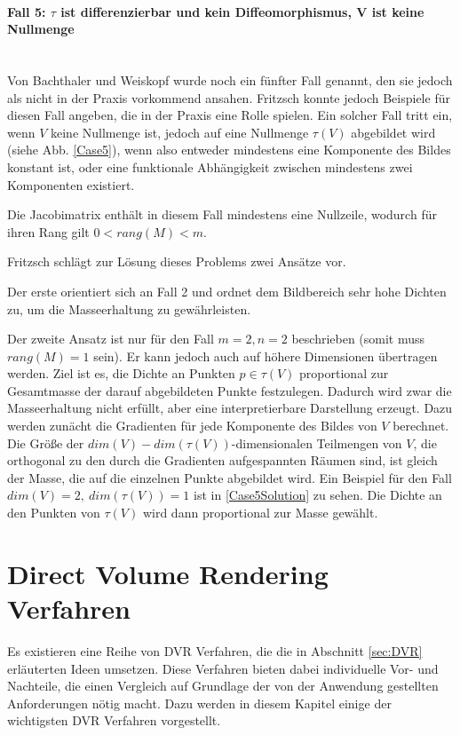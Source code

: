 \documentclass[a4paper,fontsize=12pt,toc=bib,halfparskip]{scrartcl}
\begin{document}
\paragraph{Fall 5: $\tau$ ist differenzierbar und kein Diffeomorphismus, V ist keine Nullmenge}\mbox{}\\
Von Bachthaler und Weiskopf wurde noch ein f\"unfter Fall genannt, den sie jedoch als nicht in der Praxis vorkommend ansahen. Fritzsch konnte jedoch Beispiele f\"ur diesen Fall angeben\cite[S.~23~f.]{fritzsch2016continuousScatterplot}, die in der Praxis eine Rolle spielen. Ein solcher Fall tritt ein, wenn $V$ keine Nullmenge ist, jedoch auf eine Nullmenge $\tau(V)$ abgebildet wird (siehe Abb. \ref{Case5}), wenn also entweder mindestens eine Komponente des Bildes konstant ist, oder eine funktionale Abh\"angigkeit zwischen mindestens zwei Komponenten existiert. 

Die Jacobimatrix enth\"alt in diesem Fall mindestens eine Nullzeile, wodurch f\"ur ihren Rang gilt $0 < rang(M) < m$. 

Fritzsch schl\"agt zur L\"osung dieses Problems zwei Ans\"atze vor. 

Der erste orientiert sich an Fall 2 und ordnet dem Bildbereich sehr hohe Dichten zu, um die Masseerhaltung zu gew\"ahrleisten. 

Der zweite Ansatz ist nur f\"ur den Fall $m=2, n=2$ beschrieben (somit muss $rang(M) = 1$ sein). Er kann jedoch auch auf h\"ohere Dimensionen \"ubertragen werden. Ziel ist es, die Dichte an Punkten $p\in\tau(V)$ proportional zur Gesamtmasse der darauf abgebildeten Punkte festzulegen. Dadurch wird zwar die Masseerhaltung nicht erf\"ullt, aber eine interpretierbare Darstellung erzeugt. Dazu werden zun\"acht die Gradienten f\"ur jede Komponente des Bildes von $V$ berechnet. Die Gr\"o{\ss}e der $dim(V) - dim(\tau(V))$-dimensionalen Teilmengen von $V$, die orthogonal zu den durch die Gradienten aufgespannten R\"aumen sind, ist gleich der Masse, die auf die einzelnen Punkte abgebildet wird. Ein Beispiel f\"ur den Fall $dim(V) = 2,~dim(\tau(V)) = 1$ ist in \ref{Case5Solution} zu sehen. Die Dichte an den Punkten von $\tau(V)$ wird dann proportional zur Masse gew\"ahlt.


\section{Direct Volume Rendering Verfahren}
Es existieren eine Reihe von DVR Verfahren, die die in Abschnitt \ref{sec:DVR} erl\"auterten Ideen umsetzen. Diese Verfahren bieten dabei individuelle Vor- und Nachteile, die einen Vergleich auf Grundlage der von der Anwendung gestellten Anforderungen n\"otig macht. Dazu werden in diesem Kapitel einige der wichtigsten DVR Verfahren vorgestellt.
\end{document}
